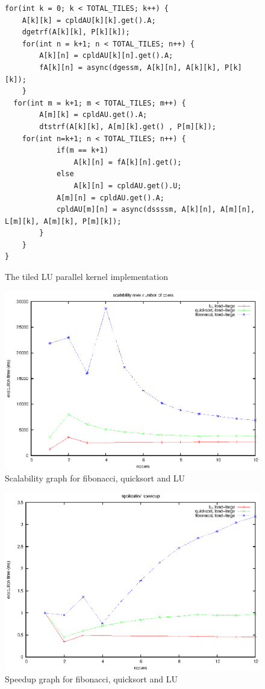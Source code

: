 \begin{figure}[!ht]
\begin{lstlisting}
for(int k = 0; k < TOTAL_TILES; k++) {
	A[k][k] = cpldAU[k][k].get().A;
	dgetrf(A[k][k], P[k][k]);
	for(int n = k+1; n < TOTAL_TILES; n++) {
		A[k][n] = cpldAU[k][n].get().A;
		fA[k][n] = async(dgessm, A[k][n], A[k][k], P[k][k]);
	}
  for(int m = k+1; m < TOTAL_TILES; m++) {
		A[m][k] = cpldAU.get().A;
		dtstrf(A[k][k], A[m][k].get() , P[m][k]);
  	for(int n=k+1; n < TOTAL_TILES; n++) {
			if(m == k+1)
				A[k][n] = fA[k][n].get();
			else
				A[k][n] = cpldAU.get().U;
			A[m][n] = cpldAU.get().A;
			cpldAU[m][n] = async(dssssm, A[k][n], A[m][n], L[m][k], A[m][k], P[m][k]);
		}
	}
}

\end{lstlisting}
\caption{The tiled LU parallel kernel implementation}
\label{lst:tiledLUpar}
\end{figure}

\begin{figure}[!ht]
\includegraphics[width=0.7\columnwidth]{figures/apps_scalability}
\caption{Scalability graph for fibonacci, quicksort and LU}
\label{fig:apps_scalability}
\end{figure}

\begin{figure}[!ht]
\includegraphics[width=0.7\columnwidth]{figures/apps_speedup}
\caption{Speedup graph for fibonacci, quicksort and LU}
\label{fig:apps_speedup}
\end{figure}


